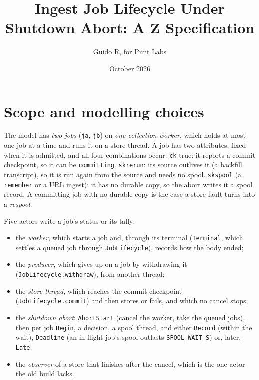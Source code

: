 \documentclass[a4paper,10pt,fleqn]{article}
\newcommand{\field}[1]{\texttt{#1}}
\begin{document}
\title{Ingest Job Lifecycle Under Shutdown Abort: A Z Specification}
\author{Guido R, for Punt Labs}
\date{October 2026}
\maketitle


\section{Scope and modelling choices}
\label{sec:scope}

The model has \emph{two jobs} (\field{ja}, \field{jb}) on \emph{one collection
worker}, which holds at most one job at a time and runs it on a store thread.
A job has two attributes, fixed when it is admitted, and all four combinations
occur. \field{ck} true: it reports a commit checkpoint, so it can be
\field{committing}. \field{skrerun}: its source outlives it (a backfill
transcript), so it is run again from the source and needs no spool. \field{skspool}
(a \field{remember} or a URL ingest): it has no durable copy, so the abort writes
it a spool record. A committing job with no durable copy is the case a store fault
turns into a \emph{respool}.

Five actors write a job's status or its tally:

\begin{itemize}
  \item the \emph{worker}, which starts a job and, through its terminal
    (\field{Terminal}, which settles a queued job through \field{JobLifecycle}), records how the body
    ended;
  \item the \emph{producer}, which gives up on a job by withdrawing it
    (\field{JobLifecycle.withdraw}), from another thread;
  \item the \emph{store thread}, which reaches the commit checkpoint
    (\field{JobLifecycle.commit}) and then stores or fails, and which no cancel
    stops;
  \item the \emph{shutdown abort}: \field{AbortStart} (cancel the worker, take
    the queued jobs), then per job \field{Begin}, a decision, a spool thread, and
    either \field{Record} (within the wait), \field{Deadline} (an in-flight job's
    spool outlasts \field{SPOOL\_WAIT\_S}) or, later, \field{Late};
  \item the \emph{observer} of a store that finishes after the cancel, which is
    the one actor the old build lacks.
\end{itemize}
\end{document}
